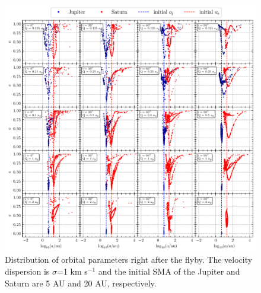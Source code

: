 \documentclass[twocolumn]{aastex63}
\begin{document}
\begin{figure}
    \includegraphics[width=\textwidth]{figs/ae-flyby.pdf}
    \caption{Distribution of orbital parameters right after the flyby. The velocity dispersion is $\sigma$=1 km s$^{-1}$ and the initial SMA of the Jupiter and Saturn are 5 AU and 20 AU, respectively.}
    \label{fig:a-et0}
\end{figure}
\end{document}

